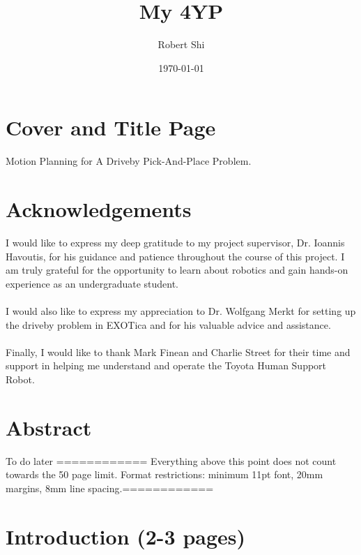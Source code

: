 \documentclass[12pt]{article}
\title{My 4YP}
\author{Robert Shi}
\date{\today}
\begin{document}
\maketitle
\newpage
\section{Cover and Title Page}
    Motion Planning for A Driveby Pick-And-Place Problem.
\newpage
\section{Acknowledgements}
    I would like to express my deep gratitude to my project supervisor, Dr. Ioannis Havoutis, for his guidance and patience throughout the course of this project. I am truly grateful for the opportunity to learn about robotics and gain hands-on experience as an undergraduate student.\\
    \hspace*{\fill}\\
    I would also like to express my appreciation to Dr. Wolfgang Merkt for setting up the driveby problem in EXOTica and for his valuable advice and assistance.\\
    \hspace*{\fill}\\
    Finally, I would like to thank Mark Finean and Charlie Street for their time and support in helping me understand and operate the Toyota Human Support Robot.
\newpage

\section{Abstract}
To do later
\newpage
\tableofcontents
============
Everything above this point does not count towards the 50 page limit.
Format restrictions: minimum 11pt font,  20mm margins, 8mm line spacing.============
\newpage
\section{Introduction (2-3 pages)}
\end{document}
